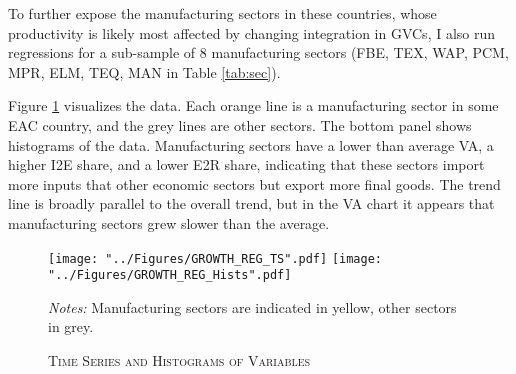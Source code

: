 \documentclass[a4paper]{article}
\begin{document}
To further expose the manufacturing sectors in these countries, whose productivity is likely most affected by changing integration in GVCs, I also run regressions for a sub-sample of 8 manufacturing sectors (FBE, TEX, WAP, PCM, MPR, ELM, TEQ, MAN in Table \ref{tab:sec}). \newline

 Figure \ref{fig:GROWTH_REG_TS} visualizes the data. Each orange line is a manufacturing sector in some EAC country, and the grey lines are other sectors. The bottom panel shows histograms of the data. Manufacturing sectors have a lower than average VA, a higher I2E share, and a lower E2R share, indicating that these sectors import more inputs that other economic sectors but export more final goods. The trend line is broadly parallel to the overall trend, but in the VA chart it appears that manufacturing sectors grew slower than the average. 

\begin{figure}[h!]
\centering
\caption{\label{fig:GROWTH_REG_TS}\textsc{Time Series and Histograms of Variables}}
\texttt{[image: "../Figures/GROWTH\_REG\_TS".pdf]}
\texttt{[image: "../Figures/GROWTH\_REG\_Hists".pdf]} %
\raggedright
\scriptsize
\emph{Notes:} Manufacturing sectors are indicated in yellow, other sectors in grey. 
\end{figure}
\FloatBarrier
\end{document}
